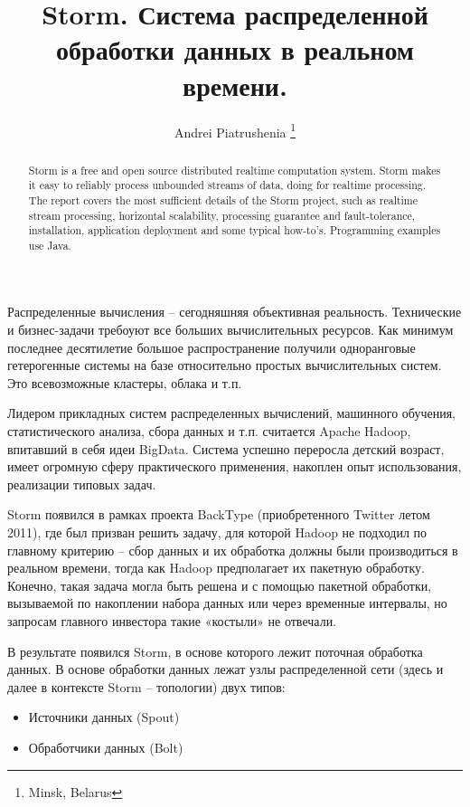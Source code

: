 \documentclass[10pt, a5paper]{article}
\begin{document}
\title{Storm. Система распределенной обработки данных в реальном времени.}
\author{Andrei Piatrushenia \footnote{Minsk, Belarus}}
\maketitle
\begin{abstract}
Storm is a free and open source distributed realtime computation system. Storm makes it easy to reliably process unbounded streams of data, doing for realtime processing.
The report covers the most sufficient details of the Storm project, such as realtime stream processing, horizontal scalability, processing guarantee and fault-tolerance, installation, application deployment and some typical how-to's. 
Programming examples use Java.
\end{abstract}
Распределенные вычисления -- сегодняшняя объективная реальность. Технические и бизнес-задачи требоуют все больших вычислительных ресурсов. Как минимум последнее десятилетие большое распространение получили одноранговые гетерогенные системы на базе относительно простых вычислительных систем. Это всевозможные кластеры, облака и т.п.

Лидером прикладных систем распределенных вычислений, машинного обучения, статистического анализа, сбора данных и т.п. считается Apache Hadoop, впитавший в себя идеи BigData. Система успешно переросла детский возраст, имеет огромную сферу практического применения, накоплен опыт использования, реализации типовых задач.

Storm появился в рамках проекта BackType (приобретенного Twitter летом 2011), где был призван решить задачу, для которой Hadoop не подходил по главному критерию – сбор данных и их обработка должны были производиться в реальном времени, тогда как Hadoop предполагает их пакетную обработку. Конечно, такая задача могла быть решена и с помощью пакетной обработки, вызываемой по накоплении набора данных или через временные интервалы, но запросам главного инвестора такие «костыли» не отвечали.

В результате появился Storm, в основе которого лежит поточная обработка данных. 
В основе обработки данных лежат узлы распределенной сети (здесь и далее в контексте Storm – топологии) двух типов:
\begin{itemize}
\item Источники данных (Spout)
\item Обработчики данных (Bolt)
\end{itemize}
\end{document}
